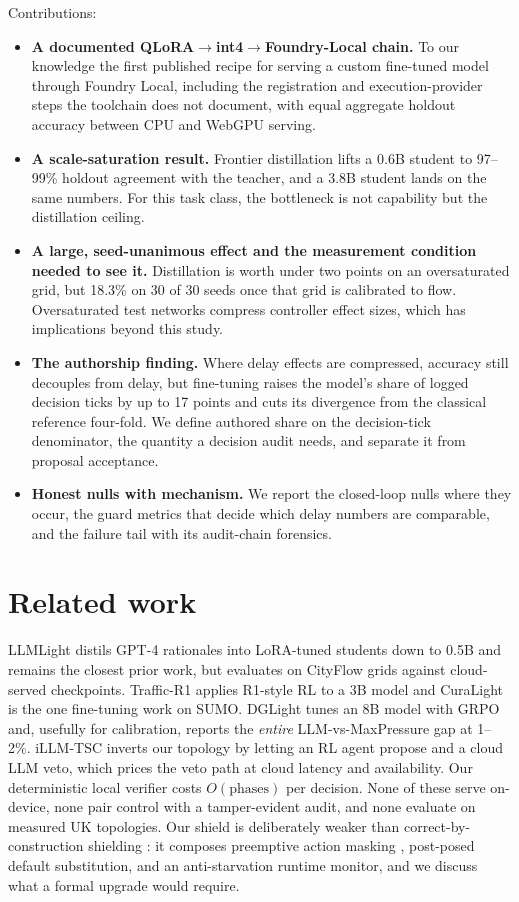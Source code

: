 \documentclass[conference]{IEEEtran}
\begin{document}
Contributions:
\begin{itemize}
\item \textbf{A documented QLoRA$\to$int4$\to$Foundry-Local chain.} To our
knowledge the first published recipe for serving a custom fine-tuned model
through Foundry Local, including the registration and execution-provider
steps the toolchain does not document, with equal aggregate holdout
accuracy between CPU and WebGPU serving.
\item \textbf{A scale-saturation result.} Frontier distillation lifts a
0.6B student to 97--99\% holdout agreement with the teacher, and a 3.8B
student lands on the same numbers. For this task class, the bottleneck is
not capability but the distillation ceiling.
\item \textbf{A large, seed-unanimous effect and the measurement condition
needed to see it.} Distillation is worth under two points on an
oversaturated grid, but 18.3\% on 30 of 30 seeds once that grid is
calibrated to flow.
Oversaturated test networks compress controller effect sizes, which has
implications beyond this study.
\item \textbf{The authorship finding.} Where delay effects are compressed,
accuracy still decouples from delay, but fine-tuning raises the model's
share of logged decision ticks by up to 17 points and cuts its divergence from
the classical reference four-fold. We define authored share on the
decision-tick denominator, the quantity a decision audit needs, and separate
it from proposal acceptance.
\item \textbf{Honest nulls with mechanism.} We report the closed-loop
nulls where they occur, the guard metrics that decide which delay numbers
are comparable, and the failure tail with its audit-chain forensics.
\end{itemize}

\section{Related work}\label{sec:related}
LLMLight \cite{lai2023llmlight} distils GPT-4 rationales into LoRA-tuned
students down to 0.5B and remains the closest prior work, but evaluates on
CityFlow grids against cloud-served checkpoints. Traffic-R1
\cite{wang2025trafficr1} applies R1-style RL to a 3B model and CuraLight
\cite{curalight2026} is the one fine-tuning work on SUMO. DGLight
\cite{dglight2026} tunes an 8B model with GRPO and, usefully for calibration,
reports the \emph{entire} LLM-vs-MaxPressure gap at 1--2\%. iLLM-TSC
\cite{pang2024illmtsc} inverts our topology by letting an RL agent propose
and a cloud LLM veto, which prices the veto path at cloud latency and
availability. Our deterministic local verifier costs $O(\text{phases})$ per
decision. None of these serve on-device, none pair control with a
tamper-evident audit, and none evaluate on measured UK topologies. Our
shield is deliberately weaker than correct-by-construction shielding
\cite{alshiekh2018shield}: it composes preemptive action masking
\cite{huang2020masking}, post-posed default substitution, and an
anti-starvation runtime monitor, and we discuss what a formal upgrade would
require.
\end{document}
